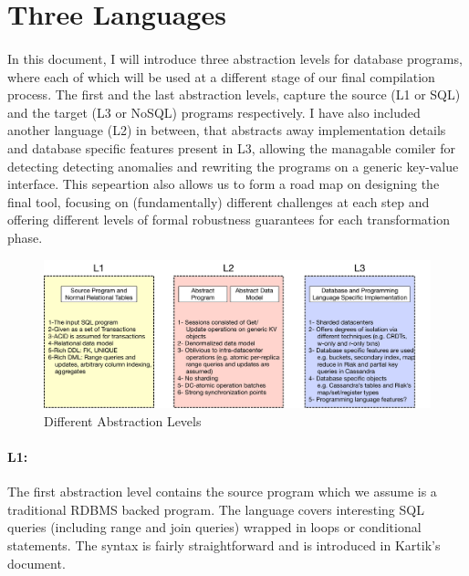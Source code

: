 \documentclass[12pt,letter]{article}
\begin{document}


\section{Three Languages}
\paragraph{}
In this document, I will introduce three abstraction levels for database programs, 
where each of which will be used at a  different stage of our final compilation process. 
The first and the last abstraction levels, capture the source (L1 or SQL) and the target 
(L3 or NoSQL) programs respectively. 
%
I have also included another language (L2) in between, that abstracts away implementation details 
and database specific features present in L3, 
allowing the managable comiler  for detecting detecting anomalies and rewriting
the programs on a generic key-value interface. 
This sepeartion also allows us to form a road map on
designing the final tool, focusing on (fundamentally) different challenges at each step and
offering different levels of formal robustness guarantees for each
transformation phase.


\begin{figure}[h]
\begin{center}
\includegraphics[width=\textwidth]{figures/levels.pdf}
\end{center}
\caption {Different Abstraction Levels}
\end{figure}

\paragraph{L1:}
The first abstraction level contains the source program which we assume is a 
traditional RDBMS backed program. 
The language covers interesting SQL queries (including range and join
queries) wrapped in loops or conditional statements. 
The syntax is fairly straightforward and is introduced in Kartik's document. 
\end{document}
